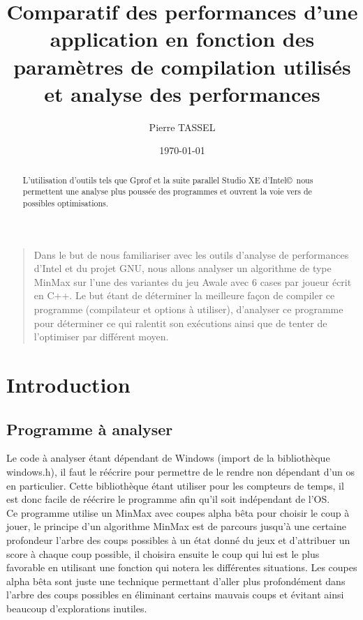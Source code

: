 \documentclass[
 aip,
 jmp,
 amsmath,amssymb,
 reprint
]{revtex4-1}
\begin{document}
\title{Comparatif des performances d'une application en fonction des paramètres de compilation utilisés et analyse des performances}

\author{Pierre TASSEL}

\date{\today}

\begin{abstract}
L'utilisation d'outils tels que Gprof et la suite parallel Studio XE d'Intel\copyright \, nous permettent une analyse plus poussée des programmes et ouvrent la voie vers de possibles optimisations.
\end{abstract}

\maketitle

\begin{quotation}
Dans le but de nous familiariser avec les outils d'analyse de performances d'Intel et du projet GNU, nous allons analyser un algorithme de type MinMax sur l'une des variantes du jeu Awale avec 6 cases par joueur écrit en C++. Le but étant de déterminer la meilleure façon de compiler ce programme (compilateur et options à utiliser), d'analyser ce programme pour déterminer ce qui ralentit son exécutions ainsi que de tenter de l'optimiser par différent moyen.
\end{quotation}

\section{Introduction}
\subsection{Programme à analyser}
Le code à analyser étant dépendant de Windows (import de la bibliothèque windows.h), il faut le réécrire pour permettre de le rendre non dépendant d'un os en particulier. Cette bibliothèque étant utiliser pour les compteurs de temps, il est donc facile de réécrire le programme afin qu'il soit indépendant de l'OS.\\
Ce programme utilise un MinMax avec coupes alpha bêta pour choisir le coup à jouer, le principe d'un algorithme MinMax est de parcours jusqu'à une certaine profondeur l'arbre des coups possibles à un état donné du jeux et d'attribuer un score à chaque coup possible, il choisira ensuite le coup qui lui est le plus favorable en utilisant une fonction qui notera les différentes situations. Les coupes alpha bêta sont juste une technique permettant d'aller plus profondément dans l'arbre des coups possibles en éliminant certains mauvais coups et évitant ainsi beaucoup d'explorations inutiles.
\end{document}

